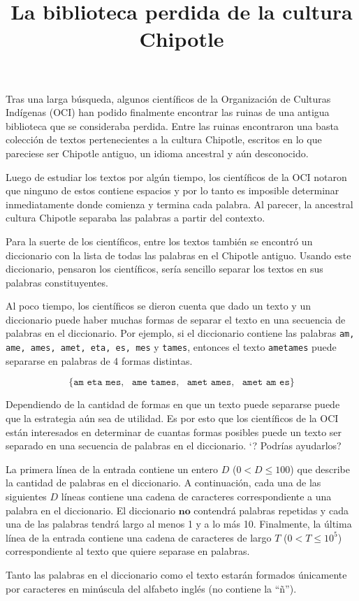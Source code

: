 \documentclass{oci}
\title{La biblioteca perdida de la cultura Chipotle}
\begin{document}
\begin{problemDescription}
Tras una larga búsqueda, algunos científicos de la Organización de Culturas
Indígenas (OCI) han podido finalmente encontrar las ruinas de una antigua
biblioteca que se consideraba perdida.
Entre las ruinas encontraron una basta colección de textos pertenecientes a la
cultura Chipotle, escritos en lo que pareciese ser Chipotle antiguo, un idioma
ancestral y aún desconocido.

Luego de estudiar los textos por algún tiempo, los científicos de la OCI notaron
que ninguno de estos contiene espacios y por lo tanto es imposible determinar
inmediatamente donde comienza y termina cada palabra.
Al parecer, la ancestral cultura Chipotle separaba las palabras a partir del
contexto.

Para la suerte de los científicos, entre los textos también se encontró un
diccionario con la lista de todas las palabras en el Chipotle antiguo.
Usando este diccionario, pensaron los científicos, sería sencillo separar los
textos en sus palabras constituyentes.

Al poco tiempo, los científicos se dieron cuenta que dado un texto y un
diccionario puede haber muchas formas de separar el texto en una secuencia de
palabras en el diccionario.
Por ejemplo, si el diccionario contiene las palabras \texttt{am, ame, ames,
  amet, eta, es, mes} y \texttt{tames}, entonces el texto \texttt{ametames}
puede separarse en palabras de 4 formas distintas.

$$\{\texttt{am eta mes},\ \ \  \texttt{ame tames},\ \ \  \texttt{amet ames},\ \ \  \texttt{amet am es}  \}$$


Dependiendo de la cantidad de formas en que un texto puede separarse puede que
la estrategia aún sea de utilidad.
Es por esto que los científicos de la OCI están interesados en determinar de
cuantas formas posibles puede un texto ser separado en una secuencia de palabras
en el diccionario.
`? Podrías ayudarlos?
\end{problemDescription}

\begin{inputDescription}
  La primera línea de la entrada contiene un entero $D$ ($0 < D \leq 100$) que
  describe la cantidad de palabras en el diccionario.
  A continuación, cada una de las siguientes $D$ líneas contiene una cadena de
  caracteres correspondiente a una palabra en el diccionario.
  El diccionario $\textbf{no}$ contendrá palabras repetidas y cada una de las
  palabras tendrá largo al menos 1 y a lo más 10.
  Finalmente, la última línea de la entrada contiene una cadena de caracteres de
  largo $T$ ($0 < T \leq 10^5$) correspondiente al texto que quiere separase en palabras.

  Tanto las palabras en el diccionario como el texto estarán formados
  únicamente por caracteres en minúscula del alfabeto inglés (no contiene la ``ñ'').
\end{inputDescription}
\end{document}
